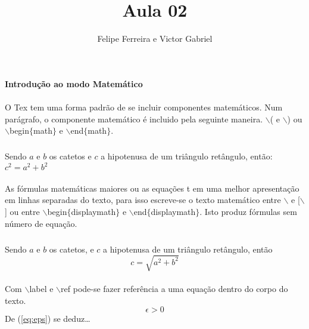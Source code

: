 \documentclass[a4paper, 12pt]{article} %
\title{Aula 02} %
\author{Felipe Ferreira e Victor Gabriel} %
\begin{document}
\maketitle %


\begin{flushleft} %
\textbf{Introdução ao modo Matemático} %
\end{flushleft} %


 	\paragraph{}O Tex tem uma forma padrão de se incluir componentes matemáticos. Num parágrafo, o componente matemático é incluido pela seguinte maneira. $\backslash$( e $\backslash$) ou $\backslash$begin$\lbrace$math$\rbrace$ e $\backslash$end$\lbrace$math$\rbrace$. %
 
 		\subparagraph{} Sendo $a$ e $b$ os catetos e $c$ a hipotenusa de um triângulo retângulo, então: $ c^{2} = a^{2} + b^{2} $ %
 
			\paragraph{} As fórmulas matemáticas maiores ou as equações t em uma melhor apresentação em linhas separadas do texto, para isso escreve-se o texto matemático entre $\backslash$ e [$\backslash$] ou entre $\backslash$begin$\lbrace$displaymath$\rbrace$ e $\backslash$end$\lbrace$displaymath$\rbrace$. Isto produz fórmulas sem número de equação. %

				\subparagraph{} Sendo $a$ e $b$ os catetos, e $c$ a hipotenusa de um triângulo retângulo, então \begin{displaymath} c = \sqrt{a^{2} + b^{2}}\end{displaymath} %

				\paragraph{} Com $\backslash$label e $\backslash$ref pode-se fazer referência a uma equação dentro do corpo do texto. %
\\
\begin{equation}\label{eq:eps} %
\epsilon > 0                   %
\end{equation} %
De (\ref{eq:eps}) se deduz\ldots  %
\end{document}
